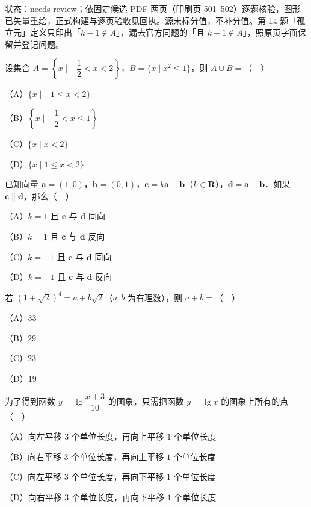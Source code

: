

状态：needs-review；依固定候选 PDF 两页（印刷页 501–502）逐题核验，图形已矢量重绘，正式构建与逐页验收见回执。源未标分值，不补分值。第 14 题「孤立元」定义只印出「$k-1\notin A$」，漏去官方同题的「且 $k+1\notin A$」，照原页字面保留并登记问题。


\begin{question}
设集合 $A=\left\{x\mid-\dfrac12<x<2\right\}$，$B=\{x\mid x^2\leqslant1\}$，则 $A\cup B=$（　）

（A）$\{x\mid-1\leqslant x<2\}$

（B）$\left\{x\mid-\dfrac12<x\leqslant1\right\}$

（C）$\{x\mid x<2\}$

（D）$\{x\mid1\leqslant x<2\}$

\end{question}
\begin{question}
已知向量 $\boldsymbol a=(1,0)$，$\boldsymbol b=(0,1)$，$\boldsymbol c=k\boldsymbol a+\boldsymbol b$（$k\in\mathbf R$），$\boldsymbol d=\boldsymbol a-\boldsymbol b$．如果 $\boldsymbol c\parallel\boldsymbol d$，那么（　）

（A）$k=1$ 且 $\boldsymbol c$ 与 $\boldsymbol d$ 同向

（B）$k=1$ 且 $\boldsymbol c$ 与 $\boldsymbol d$ 反向

（C）$k=-1$ 且 $\boldsymbol c$ 与 $\boldsymbol d$ 同向

（D）$k=-1$ 且 $\boldsymbol c$ 与 $\boldsymbol d$ 反向

\end{question}
\begin{question}
若 $(1+\sqrt2)^4=a+b\sqrt2$（$a,b$ 为有理数），则 $a+b=$（　）

（A）$33$

（B）$29$

（C）$23$

（D）$19$

\end{question}
\begin{question}
为了得到函数 $y=\lg\dfrac{x+3}{10}$ 的图象，只需把函数 $y=\lg x$ 的图象上所有的点（　）

（A）向左平移 $3$ 个单位长度，再向上平移 $1$ 个单位长度

（B）向右平移 $3$ 个单位长度，再向上平移 $1$ 个单位长度

（C）向左平移 $3$ 个单位长度，再向下平移 $1$ 个单位长度

（D）向右平移 $3$ 个单位长度，再向下平移 $1$ 个单位长度

\end{question}
